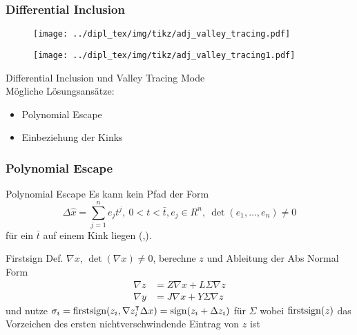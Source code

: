\begin{frame}[<+->]
\frametitle{Differential Inclusion}
\centering
\begin{figure}
  \begin{minipage}{0.45\textwidth} 
	\texttt{[image: ../dipl\_tex/img/tikz/adj\_valley\_tracing.pdf]}
	\end{minipage}
	\hfill
	\begin{minipage}{0.45\textwidth}
	\texttt{[image: ../dipl\_tex/img/tikz/adj\_valley\_tracing1.pdf]}	
	\end{minipage}
	
\end{figure}
Differential Inclusion und Valley Tracing Mode \\
\pause
Mögliche Lösungsansätze:\hfill
\begin{itemize}
 \item Polynomial Escape
 \item Einbeziehung der Kinks
\end{itemize}
\end{frame}
\begin{frame}[<+->]
\frametitle{Polynomial Escape}
\begin{block}{Polynomial Escape}
 Es kann kein Pfad der Form
 \vspace*{-0.3cm}
 \[\Delta \hat x = \sum_{j=1}^n e_j t^j, ~ 0<t<\bar t, e_j\in R^n,~ \det(e_1,\ldots,e_n) \neq 0\]
 \vspace*{0.3cm}
 für ein $\bar t$ auf einem Kink liegen (\cite[Proposition 6]{monster},\cite[S.11]{plan}).
\end{block}
\begin{block}{Firstsign}
 Def. $\nabla x$, $\det(\nabla x)\neq 0$, berechne $z$ und Ableitung der Abs Normal Form
 \vspace*{-0.3cm}
 \begin{align*}
 \nabla z &= Z \nabla x + L \Sigma \nabla z\\
 \nabla y &= J\nabla x + Y\Sigma \nabla z
 \end{align*}
 und nutze $
       \sigma_i = \operatorname{firstsign}(z_i,\nabla z_i^\intercal \Delta x) =\operatorname{sign} (z_i + \Delta z_i)
      $ für $\Sigma$
wobei $\operatorname{firstsign}(z)$ das Vorzeichen des ersten nichtverschwindende Eintrag von $z$ ist
\end{block}

\end{frame}
